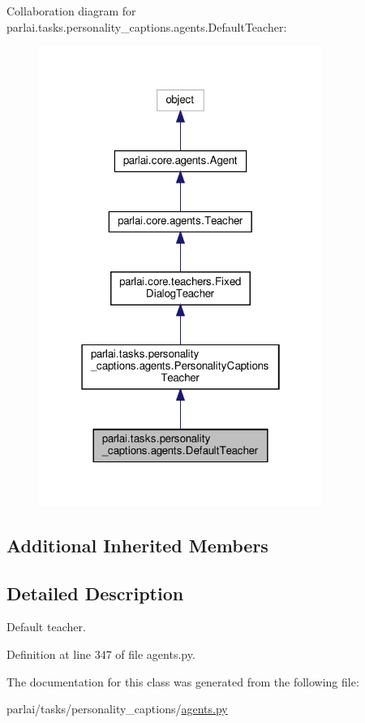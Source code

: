 Collaboration diagram for parlai.\+tasks.\+personality\+\_\+captions.\+agents.\+Default\+Teacher\+:
\nopagebreak
\begin{figure}[H]
\begin{center}
\leavevmode
\includegraphics[width=262pt]{classparlai_1_1tasks_1_1personality__captions_1_1agents_1_1DefaultTeacher__coll__graph}
\end{center}
\end{figure}
\subsection*{Additional Inherited Members}


\subsection{Detailed Description}
\begin{DoxyVerb}Default teacher.\end{DoxyVerb}
 

Definition at line 347 of file agents.\+py.



The documentation for this class was generated from the following file\+:\begin{DoxyCompactItemize}
\item 
parlai/tasks/personality\+\_\+captions/\hyperlink{parlai_2tasks_2personality__captions_2agents_8py}{agents.\+py}\end{DoxyCompactItemize}
